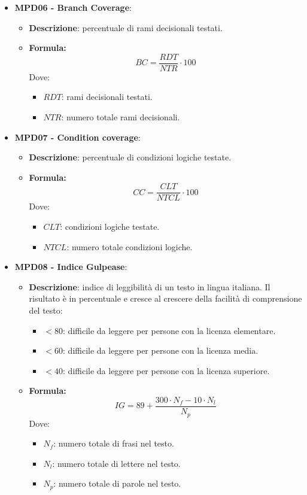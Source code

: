 \documentclass[10pt]{article}
\begin{document}
\begin{justify}
\begin{itemize}
    \item \textbf{MPD06 - Branch Coverage}:
    \begin{itemize}
        \item   \textbf{Descrizione}: percentuale di rami decisionali testati.
        \item   \textbf{Formula:}
            \[
            BC = \frac{RDT}{NTR} \cdot 100
            \]
            Dove:
            \begin{itemize}
                \item $RDT$: rami decisionali testati.
                \item $NTR$: numero totale rami decisionali.
            \end{itemize}
    \end{itemize}

    \item \textbf{MPD07 - Condition coverage}:
    \begin{itemize}
        \item   \textbf{Descrizione}: percentuale di condizioni logiche testate.
        \item   \textbf{Formula:}
            \[
            CC = \frac{CLT}{NTCL} \cdot 100
            \]
            Dove:
            \begin{itemize}
                \item $CLT$: condizioni logiche testate.
                \item $NTCL$: numero totale condizioni logiche.
            \end{itemize}
    \end{itemize}

    \item \textbf{MPD08 - Indice Gulpease}:
    \begin{itemize}
        \item \textbf{Descrizione}: indice di leggibilità di un testo in lingua italiana. Il risultato è in percentuale e cresce al crescere della facilità di comprensione del testo:
            \begin{itemize}
                \item $< 80$: difficile da leggere per persone con la licenza elementare.
                \item $< 60$: difficile da leggere per persone con la licenza media.
                \item $< 40$: difficile da leggere per persone con la licenza superiore.
            \end{itemize}
        \item \textbf{Formula:}
        \[
        IG = 89 + \frac{300 \cdot N_f - 10 \cdot N_l}{N_p}
        \]
        Dove:
        \begin{itemize}
            \item $N_f$: numero totale di frasi nel testo.
            \item $N_l$: numero totale di lettere nel testo.
            \item $N_p$: numero totale di parole nel testo.
        \end{itemize}
    \end{itemize}


\end{itemize}
\end{justify}
\end{document}
